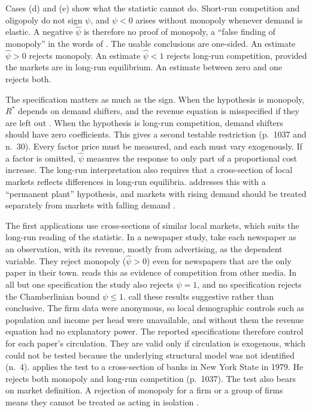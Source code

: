 Cases (d) and (e) show what the statistic cannot do. Short-run competition and oligopoly do not sign $\psi$,
and $\psi < 0$ arises without monopoly whenever demand is elastic. A negative $\hat\psi$ is therefore no proof
of monopoly, a ``false finding of monopoly'' in the words of \citet[p.~1036]{Bresnahan1989}. The usable
conclusions are one-sided. An estimate $\hat\psi > 0$ rejects monopoly. An estimate $\hat\psi < 1$ rejects
long-run competition, provided the markets are in long-run equilibrium. An estimate between zero and one
rejects both.

The specification matters as much as the sign. When the hypothesis is monopoly, $R^*$ depends on demand
shifters, and the revenue equation is misspecified if they are left out \citep[n.~28]{Bresnahan1989}. When
the hypothesis is long-run competition, demand shifters should have zero coefficients. This gives a second
testable restriction (p.~1037 and n.~30). Every factor price must be measured, and each must vary
exogenously. If a factor is omitted, $\hat\psi$ measures the response to only part of a proportional cost
increase. The long-run interpretation also requires that a cross-section of local markets reflects
differences in long-run equilibria. \citet{Rosse1970} addresses this with a ``permanent plant'' hypothesis,
and markets with rising demand should be treated separately from markets with falling demand
\citep[p.~1037]{Bresnahan1989}.

 The first applications use cross-sections of similar local markets, which suits the
long-run reading of the statistic. In a newspaper study, \citet{PanzarRosse1977} take each newspaper as an
observation, with its revenue, mostly from advertising, as the dependent variable. They reject monopoly
($\hat\psi > 0$) even for newspapers that are the only paper in their town. \citet[p.~1037]{Bresnahan1989} reads
this as evidence of competition from other media. In all but one specification the study also rejects $\psi = 1$,
and no specification rejects the Chamberlinian bound $\psi \le 1$. \citet[p.~453, n.~4]{PanzarRosse1987} call these
results suggestive rather than conclusive. The firm data were anonymous, so local demographic controls such as
population and income per head were unavailable, and without them the revenue equation had no explanatory power.
The reported specifications therefore control for each paper's circulation. They are valid only if circulation is
exogenous, which could not be tested because the underlying structural model was not identified (n.~4).
\citet{Shaffer1982} applies the test to a cross-section of
banks in New York State in 1979. He rejects both monopoly and long-run competition (p.~1037). The test also bears on market definition. A rejection of monopoly for a firm or a
group of firms means they cannot be treated as acting in isolation \citep[p.~1050]{Bresnahan1989}.

